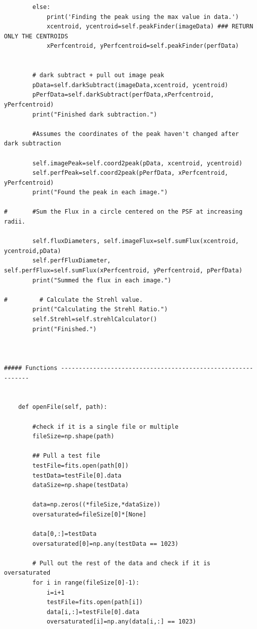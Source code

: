 \begin{lstlisting}
        else:
            print('Finding the peak using the max value in data.')
            xcentroid, ycentroid=self.peakFinder(imageData) ### RETURN ONLY THE CENTROIDS
            xPerfcentroid, yPerfcentroid=self.peakFinder(perfData)
            
        
        # dark subtract + pull out image peak
        pData=self.darkSubtract(imageData,xcentroid, ycentroid)
        pPerfData=self.darkSubtract(perfData,xPerfcentroid, yPerfcentroid)
        print("Finished dark subtraction.")
        
        #Assumes the coordinates of the peak haven't changed after dark subtraction
        
        self.imagePeak=self.coord2peak(pData, xcentroid, ycentroid)
        self.perfPeak=self.coord2peak(pPerfData, xPerfcentroid, yPerfcentroid)
        print("Found the peak in each image.")
        
#       #Sum the Flux in a circle centered on the PSF at increasing radii.  
        
        self.fluxDiameters, self.imageFlux=self.sumFlux(xcentroid, ycentroid,pData)
        self.perfFluxDiameter, self.perfFlux=self.sumFlux(xPerfcentroid, yPerfcentroid, pPerfData)
        print("Summed the flux in each image.")
        
#         # Calculate the Strehl value. 
        print("Calculating the Strehl Ratio.")
        self.Strehl=self.strehlCalculator()
        print("Finished.")
        
    
    
##### Functions -------------------------------------------------------------
        
                      
    def openFile(self, path):
            
        #check if it is a single file or multiple
        fileSize=np.shape(path)
        
        ## Pull a test file
        testFile=fits.open(path[0])
        testData=testFile[0].data
        dataSize=np.shape(testData)
        
        data=np.zeros((*fileSize,*dataSize))
        oversaturated=fileSize[0]*[None]
        
        data[0,:]=testData
        oversaturated[0]=np.any(testData == 1023)
        
        # Pull out the rest of the data and check if it is oversaturated
        for i in range(fileSize[0]-1):
            i=i+1
            testFile=fits.open(path[i])
            data[i,:]=testFile[0].data
            oversaturated[i]=np.any(data[i,:] == 1023)
        

\end{lstlisting}
